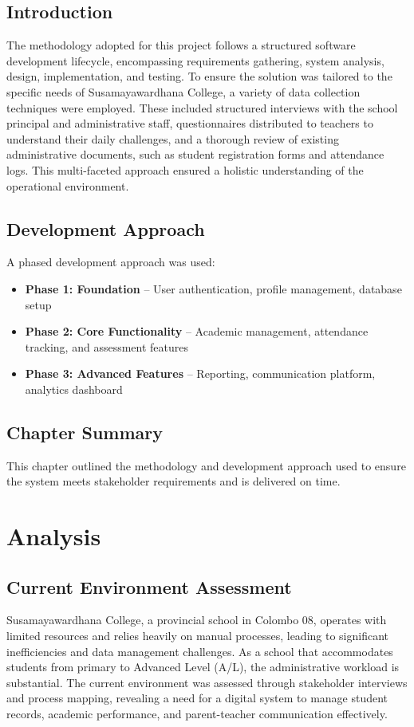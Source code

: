 \documentclass[12pt,a4paper]{report}
\begin{document}
\section{Introduction}
The methodology adopted for this project follows a structured software development lifecycle, encompassing requirements gathering, system analysis, design, implementation, and testing. To ensure the solution was tailored to the specific needs of Susamayawardhana College, a variety of data collection techniques were employed. These included structured interviews with the school principal and administrative staff, questionnaires distributed to teachers to understand their daily challenges, and a thorough review of existing administrative documents, such as student registration forms and attendance logs. This multi-faceted approach ensured a holistic understanding of the operational environment.

\section{Development Approach}
A phased development approach was used:
\begin{itemize}
    \item \textbf{Phase 1: Foundation} -- User authentication, profile management, database setup
    \item \textbf{Phase 2: Core Functionality} -- Academic management, attendance tracking, and assessment features
    \item \textbf{Phase 3: Advanced Features} -- Reporting, communication platform, analytics dashboard
\end{itemize}

\section{Chapter Summary}
This chapter outlined the methodology and development approach used to ensure the system meets stakeholder requirements and is delivered on time.

\chapter{Analysis}
\section{Current Environment Assessment}
Susamayawardhana College, a provincial school in Colombo 08, operates with limited resources and relies heavily on manual processes, leading to significant inefficiencies and data management challenges. As a school that accommodates students from primary to Advanced Level (A/L), the administrative workload is substantial. The current environment was assessed through stakeholder interviews and process mapping, revealing a need for a digital system to manage student records, academic performance, and parent-teacher communication effectively.
\end{document}
